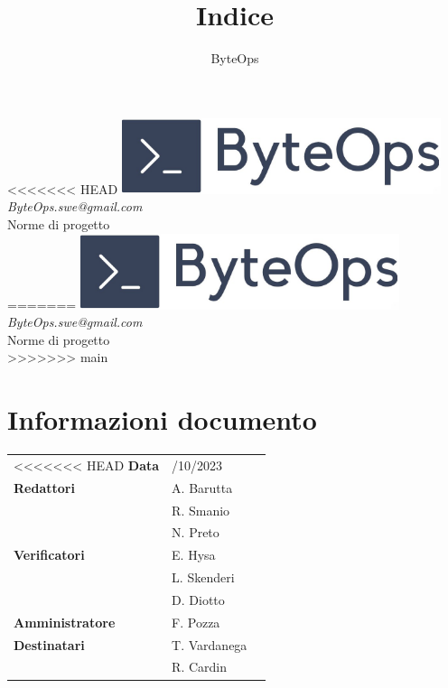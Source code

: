 \documentclass{article}
\title{\textbf{\fontsize{28}{6}\selectfont Indice}}
\author{\fontsize{14}{6}\selectfont ByteOps}
\begin{document}
\pagestyle{fancy}
\begin{center}
<<<<<<< HEAD
    \includegraphics[width = 0.7\textwidth]{../../Images/logo.png} \\
    \vspace{0.2cm}
    \textcolor[RGB]{60, 60, 60}{\textit{ByteOps.swe@gmail.com}} \\
    \vspace{2cm}
    \fontsize{16}{6}\selectfont Norme di progetto \\
    \vspace{0.5cm}
=======
\includegraphics[width = 0.7\textwidth]{../../Images/logo.png} \\
\vspace{0.2cm}
\textcolor[RGB]{60, 60, 60}{\textit{ByteOps.swe@gmail.com}} \\
\vspace{2cm}
\fontsize{16}{6}\selectfont Norme di progetto \\ 
\vspace{0.5cm}
>>>>>>> main
\end{center}

\section*{Informazioni documento}
\def\arraystretch{1.2}
\begin{tabular}{>{\raggedleft\arraybackslash}p{}|>{\raggedright\arraybackslash}p{}c}
<<<<<<< HEAD
    \hline
    \addlinespace
    \textbf{Data}           & 30/10/2023 \vspace{10pt} \\
    \textbf{Redattori}      & A. Barutta               \\ & R. Smanio \\ & N. Preto \vspace{10pt} \\
    \textbf{Verificatori}   & E. Hysa                  \\ & L. Skenderi \\ & D. Diotto \vspace{10pt} \\
    \textbf{Amministratore} & F. Pozza \vspace{10pt}   \\
    \textbf{Destinatari}    & T. Vardanega             \\ & R. Cardin \vspace{10pt} \\
\end{tabular}
\pagebreak
\end{document}
